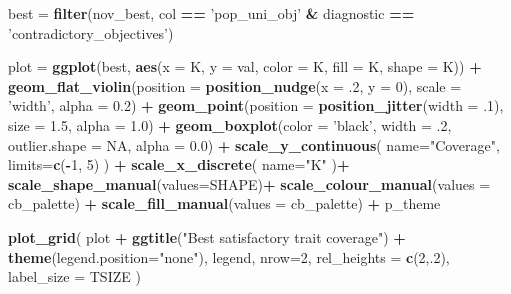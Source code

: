 \documentclass[]{book}
\newenvironment{Shaded}{\begin{snugshade}}{\end{snugshade}}
\newcommand{\DataTypeTok}[1]{\textcolor[rgb]{0.13,0.29,0.53}{#1}}
\newcommand{\DecValTok}[1]{\textcolor[rgb]{0.00,0.00,0.81}{#1}}
\newcommand{\FloatTok}[1]{\textcolor[rgb]{0.00,0.00,0.81}{#1}}
\newcommand{\KeywordTok}[1]{\textcolor[rgb]{0.13,0.29,0.53}{\textbf{#1}}}
\newcommand{\NormalTok}[1]{#1}
\newcommand{\OperatorTok}[1]{\textcolor[rgb]{0.81,0.36,0.00}{\textbf{#1}}}
\newcommand{\OtherTok}[1]{\textcolor[rgb]{0.56,0.35,0.01}{#1}}
\newcommand{\StringTok}[1]{\textcolor[rgb]{0.31,0.60,0.02}{#1}}
\begin{document}
\begin{Shaded}
\begin{Highlighting}[]
\NormalTok{best =}\StringTok{ }\KeywordTok{filter}\NormalTok{(nov_best, col }\OperatorTok{==}\StringTok{ 'pop_uni_obj'} \OperatorTok{&}\StringTok{ }\NormalTok{diagnostic }\OperatorTok{==}\StringTok{ 'contradictory_objectives'}\NormalTok{)}

\NormalTok{plot =}\StringTok{ }\KeywordTok{ggplot}\NormalTok{(best, }\KeywordTok{aes}\NormalTok{(}\DataTypeTok{x =}\NormalTok{ K, }\DataTypeTok{y =}\NormalTok{ val, }\DataTypeTok{color =}\NormalTok{ K, }\DataTypeTok{fill =}\NormalTok{ K, }\DataTypeTok{shape =}\NormalTok{ K)) }\OperatorTok{+}
\StringTok{  }\KeywordTok{geom_flat_violin}\NormalTok{(}\DataTypeTok{position =} \KeywordTok{position_nudge}\NormalTok{(}\DataTypeTok{x =} \FloatTok{.2}\NormalTok{, }\DataTypeTok{y =} \DecValTok{0}\NormalTok{), }\DataTypeTok{scale =} \StringTok{'width'}\NormalTok{, }\DataTypeTok{alpha =} \FloatTok{0.2}\NormalTok{) }\OperatorTok{+}
\StringTok{  }\KeywordTok{geom_point}\NormalTok{(}\DataTypeTok{position =} \KeywordTok{position_jitter}\NormalTok{(}\DataTypeTok{width =} \FloatTok{.1}\NormalTok{), }\DataTypeTok{size =} \FloatTok{1.5}\NormalTok{, }\DataTypeTok{alpha =} \FloatTok{1.0}\NormalTok{) }\OperatorTok{+}
\StringTok{  }\KeywordTok{geom_boxplot}\NormalTok{(}\DataTypeTok{color =} \StringTok{'black'}\NormalTok{, }\DataTypeTok{width =} \FloatTok{.2}\NormalTok{, }\DataTypeTok{outlier.shape =} \OtherTok{NA}\NormalTok{, }\DataTypeTok{alpha =} \FloatTok{0.0}\NormalTok{) }\OperatorTok{+}
\StringTok{  }\KeywordTok{scale_y_continuous}\NormalTok{(}
    \DataTypeTok{name=}\StringTok{"Coverage"}\NormalTok{,}
    \DataTypeTok{limits=}\KeywordTok{c}\NormalTok{(}\OperatorTok{-}\DecValTok{1}\NormalTok{, }\DecValTok{5}\NormalTok{)}
\NormalTok{  ) }\OperatorTok{+}
\StringTok{  }\KeywordTok{scale_x_discrete}\NormalTok{(}
    \DataTypeTok{name=}\StringTok{"K"}
\NormalTok{  )}\OperatorTok{+}
\StringTok{  }\KeywordTok{scale_shape_manual}\NormalTok{(}\DataTypeTok{values=}\NormalTok{SHAPE)}\OperatorTok{+}
\StringTok{  }\KeywordTok{scale_colour_manual}\NormalTok{(}\DataTypeTok{values =}\NormalTok{ cb_palette) }\OperatorTok{+}
\StringTok{  }\KeywordTok{scale_fill_manual}\NormalTok{(}\DataTypeTok{values =}\NormalTok{ cb_palette) }\OperatorTok{+}
\StringTok{  }\NormalTok{p_theme}

\KeywordTok{plot_grid}\NormalTok{(}
\NormalTok{  plot }\OperatorTok{+}
\StringTok{    }\KeywordTok{ggtitle}\NormalTok{(}\StringTok{"Best satisfactory trait coverage"}\NormalTok{) }\OperatorTok{+}
\StringTok{    }\KeywordTok{theme}\NormalTok{(}\DataTypeTok{legend.position=}\StringTok{"none"}\NormalTok{),}
\NormalTok{  legend,}
  \DataTypeTok{nrow=}\DecValTok{2}\NormalTok{,}
  \DataTypeTok{rel_heights =} \KeywordTok{c}\NormalTok{(}\DecValTok{2}\NormalTok{,.}\DecValTok{2}\NormalTok{),}
  \DataTypeTok{label_size =}\NormalTok{ TSIZE}
\NormalTok{)}
\end{Highlighting}
\end{Shaded}
\end{document}
